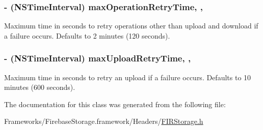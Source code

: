 \subsubsection[{max\+Operation\+Retry\+Time}]{\setlength{\rightskip}{0pt plus 5cm}-\/ (N\+S\+Time\+Interval) max\+Operation\+Retry\+Time\hspace{0.3cm}{\ttfamily [read]}, {\ttfamily [write]}, {\ttfamily [atomic]}}\label{interface_f_i_r_storage_a197aa620f2ba27a1c898e6c77b791f0f}
Maximum time in seconds to retry operations other than upload and download if a failure occurs. Defaults to 2 minutes (120 seconds). \hypertarget{interface_f_i_r_storage_aa661aa6cfbf3810148d56a3897002549}{}
\subsubsection[{max\+Upload\+Retry\+Time}]{\setlength{\rightskip}{0pt plus 5cm}-\/ (N\+S\+Time\+Interval) max\+Upload\+Retry\+Time\hspace{0.3cm}{\ttfamily [read]}, {\ttfamily [write]}, {\ttfamily [atomic]}}\label{interface_f_i_r_storage_aa661aa6cfbf3810148d56a3897002549}
Maximum time in seconds to retry an upload if a failure occurs. Defaults to 10 minutes (600 seconds). 

The documentation for this class was generated from the following file\+:\begin{DoxyCompactItemize}
\item 
Frameworks/\+Firebase\+Storage.\+framework/\+Headers/\hyperlink{_f_i_r_storage_8h}{F\+I\+R\+Storage.\+h}\end{DoxyCompactItemize}
